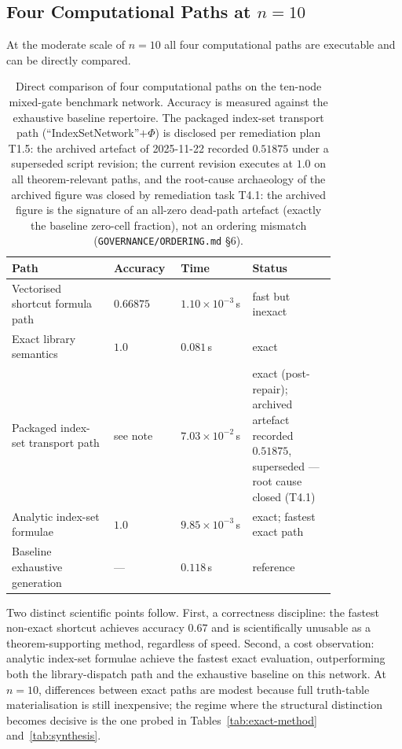 \documentclass[11pt]{article}
\theoremstyle{definition}
\begin{document}
\subsection{Four Computational Paths at \texorpdfstring{\(n=10\)}{n=10}}\label{sec:four-paths}

At the moderate scale of \(n=10\) all four computational paths are executable and can be directly
compared.

\begin{table}[h]
\centering
\begin{tabular}{p{0.29\linewidth}p{0.12\linewidth}p{0.18\linewidth}p{0.23\linewidth}}
\toprule
\textbf{Path} & \textbf{Accuracy} & \textbf{Time} & \textbf{Status} \\
\midrule
Vectorised shortcut formula path & \(0.66875\) & \(1.10\times10^{-3}\)\,s & fast but inexact \\
Exact library semantics           & \(1.0\)     & \(0.081\)\,s             & exact \\
Packaged index-set transport path & see note   & \(7.03\times10^{-2}\)\,s & exact (post-repair); archived artefact recorded \(0.51875\), superseded --- root cause closed (T4.1) \\
Analytic index-set formulae       & \(1.0\)     & \(9.85\times10^{-3}\)\,s & exact; fastest exact path \\
Baseline exhaustive generation    & ---         & \(0.118\)\,s             & reference \\
\bottomrule
\end{tabular}
\caption{Direct comparison of four computational paths on the ten-node mixed-gate benchmark network.
Accuracy is measured against the exhaustive baseline repertoire. The packaged index-set
transport path (``IndexSetNetwork''\(+\Phi\)) is disclosed per remediation plan T1.5: the
archived artefact of 2025-11-22 recorded \(0.51875\) under a superseded script revision;
the current revision executes at \(1.0\) on all theorem-relevant paths, and the root-cause
archaeology of the archived figure was closed by remediation task T4.1: the archived figure is the
signature of an all-zero dead-path artefact (exactly the baseline zero-cell fraction), not an
ordering mismatch (\texttt{GOVERNANCE/ORDERING.md} \S6).}
\label{tab:four-paths}
\end{table}

Two distinct scientific points follow. First, a correctness discipline: the fastest non-exact
shortcut achieves accuracy \(0.67\) and is scientifically unusable as a theorem-supporting method,
regardless of speed. Second, a cost observation: analytic index-set formulae achieve the fastest
exact evaluation, outperforming both the library-dispatch path and the exhaustive baseline on this
network. At \(n=10\), differences between exact paths are modest because full truth-table
materialisation is still inexpensive; the regime where the structural distinction becomes decisive
is the one probed in Tables~\ref{tab:exact-method} and~\ref{tab:synthesis}.
\end{document}
